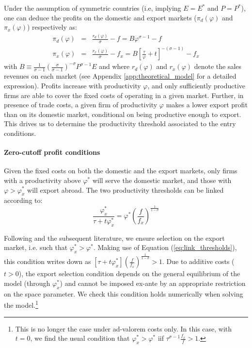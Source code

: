 \documentclass[a4paper,11pt]{article}
\begin{document}
Under the assumption of symmetric countries (i.e, implying $E=E^\ast$ and $P=P^\ast$), one can deduce the profits on the domestic and export markets ($\pi_d(\varphi)$ and $\pi_x(\varphi)$) respectively as:
\begin{eqnarray}
\pi_d(\varphi)  &=& \frac{r_d(\varphi)}{\sigma} - f = B \varphi^{\sigma-1} - f \label{eq:pid_rd}\\
\pi_x(\varphi) &=& \frac{r_x(\varphi)}{\sigma} - f_x = B \left[ \frac{\tau}{\varphi} + t\right]^{-(\sigma-1)} - f_x \label{eq:pix_rx}
\end{eqnarray}
\noindent with $B \equiv \frac{1}{\sigma-1}\left(\frac{\sigma}{\sigma-1}\right)^{-\sigma}P^{\sigma-1}E$ and where $r_d(\varphi)$ and $r_x(\varphi)$ denote the sales revenues on each market (see Appendix \ref{app:theoretical_model} for a detailed expression). Profits increase with productivity $\varphi$, and only sufficiently productive firms are able to cover the fixed costs of operating in a given market. Further, in presence of trade costs, a given firm of productivity $\varphi$ makes a lower export profit than on its domestic market, conditional on being productive enough to export. This drives us to determine the productivity threshold associated to the entry conditions.


\paragraph{Zero-cutoff profit conditions} Given the fixed costs on both the domestic and the export markets, only firms with a productivity above $\varphi^\ast$ will serve the domestic market, and those with $\varphi>\varphi_x^\ast$ will export abroad.  The two productivity thresholds can be linked according to:
\begin{equation}
\frac{\varphi_x^\ast}{\tau+t\varphi_x^\ast} = \varphi^\ast \left( \frac{f}{f_x} \right)^{\frac{1}{1-\sigma}} \label{eq:link_thresholds}
\end{equation}

Following \cite{melitz} and the subsequent literature, we ensure selection on the export market, i.e. such that $\varphi_x^\ast > \varphi^\ast$. Making use of Equation (\ref{eq:link_thresholds}), this condition writes down as $\left[\tau+ t\varphi^\ast_x \right] \left( \frac{f}{f_x} \right)^{\frac{1}{1-\sigma}} >1$. Due to additive costs ($t>0$), the export selection condition depends on the general equilibrium of the model (through $\varphi^\ast_x $) and cannot be imposed ex-ante by an appropriate restriction on the space parameter. We check this condition holds numerically when solving the model.\footnote{This is no longer the case under ad-valorem costs only. In this case, with $t=0$, we find the usual condition that $\varphi^\ast_x >\varphi^\ast$ iif $\tau^{\sigma-1}\frac{f_x}{f}>1$.}
\end{document}
